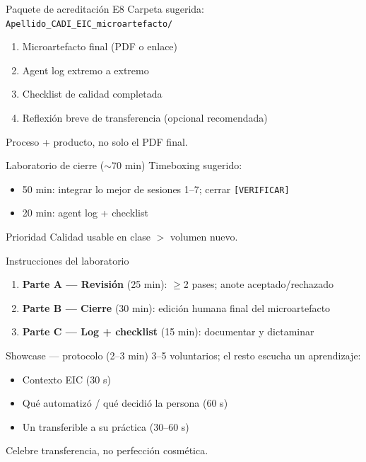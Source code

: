 \documentclass[aspectratio=169,11pt]{beamer}
\begin{document}
\begin{frame}{Paquete de acreditación E8}
Carpeta sugerida: \texttt{Apellido\_CADI\_EIC\_microartefacto/}
\begin{enumerate}
\item Microartefacto final (PDF o enlace)
\item Agent log extremo a extremo
\item Checklist de calidad completada
\item Reflexión breve de transferencia (opcional recomendada)
\end{enumerate}
Proceso + producto, no solo el PDF final.
\end{frame}

\begin{frame}{Laboratorio de cierre ($\sim$70 min)}
Timeboxing sugerido:
\begin{itemize}
\item 50 min: integrar lo mejor de sesiones 1--7; cerrar \texttt{[VERIFICAR]}
\item 20 min: agent log + checklist
\end{itemize}
\begin{block}{Prioridad}
Calidad usable en clase $>$ volumen nuevo.
\end{block}
\end{frame}

\begin{frame}{Instrucciones del laboratorio}
\begin{enumerate}
\item \textbf{Parte A --- Revisión} (25 min): $\geq$2 pases; anote aceptado/rechazado
\item \textbf{Parte B --- Cierre} (30 min): edición humana final del microartefacto
\item \textbf{Parte C --- Log + checklist} (15 min): documentar y dictaminar
\end{enumerate}
\end{frame}

\begin{frame}{Showcase --- protocolo (2--3 min)}
3--5 voluntarios; el resto escucha un aprendizaje:
\begin{itemize}
\item Contexto EIC (30 s)
\item Qué automatizó / qué decidió la persona (60 s)
\item Un transferible a su práctica (30--60 s)
\end{itemize}
Celebre transferencia, no perfección cosmética.
\end{frame}
\end{document}
